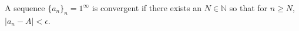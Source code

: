 \documentclass[12pt]{article}
\newcommand{\N}{\mathbb{N}}
\begin{document}
A sequence $\{a_n\}_n=1^\infty$ is convergent if there exists an $N\in \N$ so that for $n\geq N$, $|a_n-A|<\epsilon$. 
\end{document}
